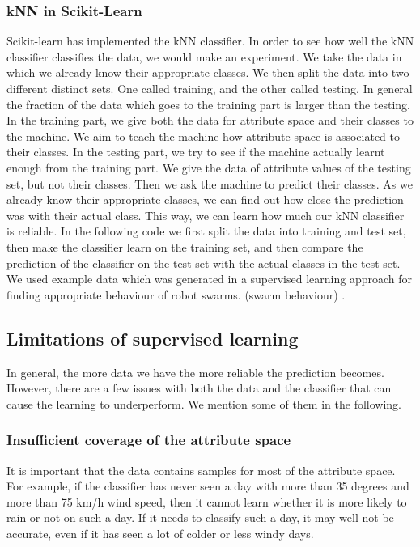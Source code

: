 \documentclass[10pt,a4paper]{article}
\begin{document}
\subsubsection{kNN in Scikit-Learn}
Scikit-learn has implemented the kNN classifier. In order to see how well the kNN classifier classifies the data, we would make an experiment. We take the  data in which we already know  their appropriate classes. We then split the data into two different distinct sets. One called training, and the other called testing. In general the fraction of the data which goes to the training part is larger than the testing. In the training part, we give both the data for attribute space and their classes to the machine. We aim to teach the machine how attribute space is associated to their classes. In the testing part, we try to see if the machine actually learnt enough from the training part. We give the data of attribute values of the testing set, but not their classes. Then we ask the machine to predict their classes. As we already know their appropriate classes, we can find out how close the prediction was with their actual class. This way, we can learn how much our kNN classifier is reliable. In the following code we first split the data into training and test set, then make the classifier learn on the training set, and then compare the prediction of the classifier on the test set with the actual classes in the test set. We used example data  which was generated in a supervised learning approach for finding appropriate behaviour of robot swarms. (swarm behaviour) \cite{carl}.
\label{classifier.py}


\subsection{Limitations of supervised learning}
In general, the more data we have the more reliable the prediction becomes. However, there are a few issues with both the data and the classifier that can cause the learning to underperform. We mention some of them in the following.
\subsubsection{Insufficient coverage of the attribute space} \label{insuf}
It is important that the data contains samples for most of the attribute space. For example, if the classifier has never seen a day with more than 35 degrees and more than 75 km/h wind speed, then it cannot learn whether it is more likely to rain or not on such a day. If it needs to classify such a day, it may well not be accurate, even if it has seen a lot of colder or less windy days. %
\end{document}
